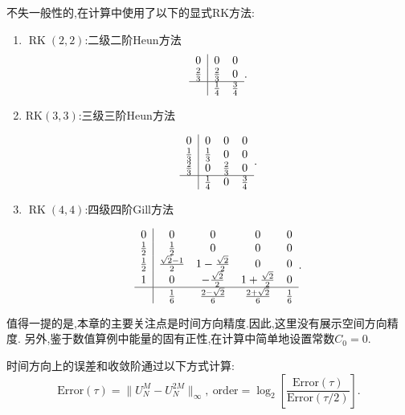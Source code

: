 不失一般性的,在计算中使用了以下的显式RK方法\cite{shuEfficientImplementationEssentially1988}:
\begin{enumerate}
\item $\operatorname{RK}(2,2)$:二级二阶Heun方法%
\begin{equation}
\begin{array}{c|cc}
0 & 0 & 0 \\
\frac{2}{3} & \frac{2}{3} & 0 \\
\hline & \frac{1}{4} & \frac{3}{4}
\end{array}.
\end{equation}
	
\item $\mathrm{RK}(3,3)$:三级三阶Heun方法%
	
\begin{equation}
\begin{array}{c|ccc}
0 & 0 & 0 & 0 \\
\frac{1}{3} & \frac{1}{3} & 0 & 0 \\
\frac{2}{3} & 0 & \frac{2}{3} & 0 \\
\hline & \frac{1}{4} & 0 & \frac{3}{4}
\end{array}.
\end{equation}
		
\item $\operatorname{RK}(4,4)$:四级四阶Gill方法%
		
\begin{equation}
\begin{array}{c|cccc}
0 & 0 & 0 & 0 & 0 \\
\frac{1}{2} & \frac{1}{2} & 0 & 0 & 0 \\
\frac{1}{2} & \frac{\sqrt{2}-1}{2} & 1-\frac{\sqrt{2}}{2} & 0 & 0 \\
1 & 0 & -\frac{\sqrt{2}}{2} & 1+\frac{\sqrt{2}}{2} & 0 \\
\hline & \frac{1}{6} & \frac{2-\sqrt{2}}{6} & \frac{2+\sqrt{2}}{6} & \frac{1}{6}
\end{array}.
\end{equation}
\end{enumerate}

值得一提的是,本章的主要关注点是时间方向精度.因此,这里没有展示空间方向精度.
另外,鉴于数值算例中能量的固有正性,在计算中简单地设置常数$C_0=0$.

时间方向上的误差和收敛阶通过以下方式计算:
\begin{equation}
	\text{Error}(\tau) = \|U_{N}^{M} - U_{N}^{2 M}\|_{\infty},~\text{order} = \log_{2}\left[\frac{\text{Error}(\tau)}{\text{Error}(\tau / 2)}\right].\label{eq_SAVRRK:104}
\end{equation}

